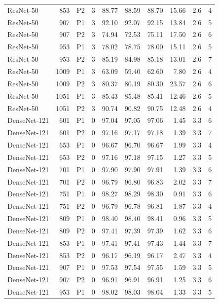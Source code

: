 {\begin{longtable}{lrllrrrrrr}
ResNet-50 & 853 & P2 & 3 & 88.77 & 88.59 & 88.70 & 15.66 & 2.6 & 4 \\
ResNet-50 & 907 & P1 & 3 & 92.10 & 92.07 & 92.15 & 13.84 & 2.6 & 5 \\
ResNet-50 & 907 & P2 & 3 & 74.94 & 72.53 & 75.11 & 17.50 & 2.6 & 6 \\
ResNet-50 & 953 & P1 & 3 & 78.02 & 78.75 & 78.00 & 15.11 & 2.6 & 5 \\
ResNet-50 & 953 & P2 & 3 & 85.19 & 84.98 & 85.18 & 13.01 & 2.6 & 7 \\
ResNet-50 & 1009 & P1 & 3 & 63.09 & 59.40 & 62.60 & 7.80 & 2.6 & 4 \\
ResNet-50 & 1009 & P2 & 3 & 80.37 & 80.19 & 80.30 & 23.57 & 2.6 & 6 \\
ResNet-50 & 1051 & P1 & 3 & 85.43 & 85.48 & 85.41 & 12.46 & 2.6 & 5 \\
ResNet-50 & 1051 & P2 & 3 & 90.74 & 90.82 & 90.75 & 12.48 & 2.6 & 4 \\
DenseNet-121 & 601 & P1 & 0 & 97.04 & 97.05 & 97.06 & 1.45 & 3.3 & 6 \\
DenseNet-121 & 601 & P2 & 0 & 97.16 & 97.17 & 97.18 & 1.39 & 3.3 & 7 \\
DenseNet-121 & 653 & P1 & 0 & 96.67 & 96.70 & 96.67 & 1.99 & 3.3 & 4 \\
DenseNet-121 & 653 & P2 & 0 & 97.16 & 97.18 & 97.15 & 1.27 & 3.3 & 5 \\
DenseNet-121 & 701 & P1 & 0 & 97.90 & 97.90 & 97.91 & 1.39 & 3.3 & 6 \\
DenseNet-121 & 701 & P2 & 0 & 96.79 & 96.80 & 96.83 & 2.02 & 3.3 & 7 \\
DenseNet-121 & 751 & P1 & 0 & 98.27 & 98.29 & 98.30 & 0.91 & 3.3 & 6 \\
DenseNet-121 & 751 & P2 & 0 & 96.79 & 96.78 & 96.81 & 1.87 & 3.3 & 4 \\
DenseNet-121 & 809 & P1 & 0 & 98.40 & 98.40 & 98.41 & 0.96 & 3.3 & 5 \\
DenseNet-121 & 809 & P2 & 0 & 97.41 & 97.39 & 97.39 & 1.62 & 3.3 & 6 \\
DenseNet-121 & 853 & P1 & 0 & 97.41 & 97.41 & 97.43 & 1.44 & 3.3 & 7 \\
DenseNet-121 & 853 & P2 & 0 & 96.17 & 96.19 & 96.17 & 2.47 & 3.3 & 4 \\
DenseNet-121 & 907 & P1 & 0 & 97.53 & 97.54 & 97.55 & 1.59 & 3.3 & 5 \\
DenseNet-121 & 907 & P2 & 0 & 96.91 & 96.91 & 96.91 & 1.25 & 3.3 & 6 \\
DenseNet-121 & 953 & P1 & 0 & 98.02 & 98.03 & 98.04 & 1.33 & 3.3 & 5 \\

\end{longtable}}
